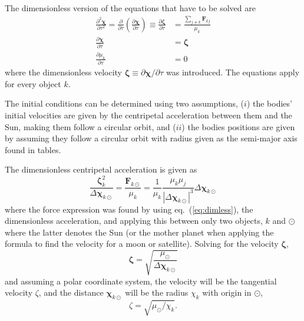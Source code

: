 \documentclass[a4paper,11pt]{article}
\begin{document}
The dimensionless version of the equations that have to be solved are
\begin{subequations}
    \begin{align}
        \frac{\partial^2 \boldsymbol{\chi}}{\partial \tau^2} = \frac{\partial}{\partial \tau} \left( \frac{\partial \boldsymbol{\chi}}{\partial \tau} \right) \equiv \frac{\partial \boldsymbol{\zeta}}{\partial \tau}  &= \frac{\sum_{j\neq k} \mathbf{F}_{kj}}{\mu_k} \\
        \frac{\partial \boldsymbol{\chi}}{\partial \tau} &= \boldsymbol{\zeta} \\
        \frac{\partial \mu_k}{\partial \tau} &= 0
    \end{align}
    \label{eq:functions}
\end{subequations}
where the dimensionless velocity $\boldsymbol{\zeta} \equiv \partial \boldsymbol{\chi}/\partial \tau$ was introduced. The equations apply for every object $k$.

The initial conditions can be determined using two assumptions, ($i$) the bodies' initial velocities are given by the centripetal acceleration between them and the Sun, making them follow a circular orbit, and ($ii$) the bodies positions are given by assuming they follow a circular orbit with radius given as the semi-major axis found in tables. 

The dimensionless centripetal acceleration is given as 
\begin{equation}
    \frac{\boldsymbol{\zeta}_k^2}{\Delta \boldsymbol{\chi}_{k\odot}} = \frac{\mathbf{F}_{k\odot}}{\mu_k} = \frac{1}{\mu_k} \frac{\mu_k \mu_j}{|\Delta \boldsymbol{\chi}_{k\odot}|^3} \Delta \boldsymbol{\chi}_{k\odot}
    \label{eq:centracc}
\end{equation}
where the force expression was found by using eq.~(\ref{eq:dimless}), the dimensionless acceleration, and applying this between only two objects, $k$ and $\odot$ where the latter denotes the Sun (or the mother planet when applying the formula to find the velocity for a moon or satellite). Solving for the velocity $\boldsymbol{\zeta}$,
\[
    \boldsymbol{\zeta} = \sqrt{\frac{\mu_\odot}{\Delta \boldsymbol{\chi}_{k\odot}}}
\]
and assuming a polar coordinate system, the velocity will be the tangential velocity $\zeta$, and the distance $\boldsymbol{\chi}_{k\odot}$ will be the radius $\chi_{k}$ with origin in $\odot$,
\begin{equation}
    \zeta = \sqrt{\mu_\odot/ \chi_{k}}.
    \label{eq:centracc_used}
\end{equation}
\end{document}
